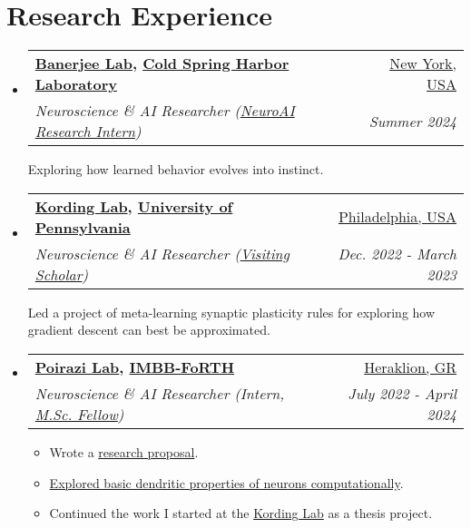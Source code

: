 \documentclass[letterpaper,11pt]{article}
\makeatletter
\newcommand{\resumeSubheading}[4]{
  \vspace{-1pt}\item
    \begin{tabular*}{0.97\textwidth}[t]{l@{\extracolsep{\fill}}r}
      \textbf{#1} & #2 \\
      \textit{\small#3} & \textit{\small #4} \\
    \end{tabular*}\vspace{-5pt}
}
\newcommand{\resumeSubHeadingListStart}{\begin{itemize}[leftmargin=*]}
\newcommand{\resumeSubHeadingListEnd}{\end{itemize}}
\makeatother
\begin{document}
\section{Research Experience}
  \resumeSubHeadingListStart
    \resumeSubheading
      {\href{https://www.arkabanerjeelab.com/}{\raisebox{-0.3em}{\texttt{[image: icons/brainwire.png]}} Banerjee Lab}, \href{https://www.cshl.edu/}{\raisebox{-0.2em}{\texttt{[image: icons/cshl.png]}} Cold Spring Harbor Laboratory} \label{BanerjeeLabMarker}}{\href{https://en.wikipedia.org/wiki/Cold_Spring_Harbor,_New_York}{New York, USA}}
      {Neuroscience \& AI Researcher (\hyperref[CSHLNeuroAIResearchInternFundingMarker]{NeuroAI Research Intern})}{Summer 2024}
      \newline Exploring how learned behavior evolves into instinct.
    \resumeSubheading
      {\href{http://kordinglab.com/}{\raisebox{-0.2em}{\texttt{[image: icons/kordinglab.jpg]}} Kording Lab}, \href{https://www.upenn.edu/}{\raisebox{-0.2em}{\texttt{[image: icons/upenn.jpg]}} University of Pennsylvania} \label{KordingLabMarker}}{\href{https://en.wikipedia.org/wiki/Philadelphia}{Philadelphia, USA}}
      {Neuroscience \& AI Researcher (\hyperref[UPennVisitingScholarFundingMarker]{Visiting Scholar})}{Dec. 2022 - March 2023}
      \newline Led a project of meta-learning synaptic plasticity rules for exploring how gradient descent can best be approximated.
    \resumeSubheading
      {\href{https://dendrites.gr/}{\raisebox{-0.2em}{\texttt{[image: icons/poirazilab.jpg]}} Poirazi Lab}, \href{https://www.imbb.forth.gr/en/}{\raisebox{-0.2em}{\texttt{[image: icons/imbb.jpg]}} IMBB-FoRTH} \label{PoiraziLabMarker}}{\href{https://en.wikipedia.org/wiki/Heraklion}{Heraklion, GR}}
      {Neuroscience \& AI Researcher (Intern, \hyperref[IMBBFoRTHFellowshipMarker]{M.Sc. Fellow})}{July 2022 - April 2024}
      \begin{itemize}
        \setlength\itemsep{-0.3em}
        \item Wrote a \href{https://raw.githubusercontent.com/ckarageorgkaneen/redicn/master/proposal.pdf}{research proposal}.
        \item \href{https://github.com/ckarageorgkaneen/nobrianer/blob/main/nobrianer.ipynb}{Explored basic dendritic properties of neurons computationally}.
        \item Continued the work I started at the \hyperref[KordingLabMarker]{Kording Lab} as a thesis project.
      \end{itemize}
    \resumeSubHeadingListEnd
\end{document}

